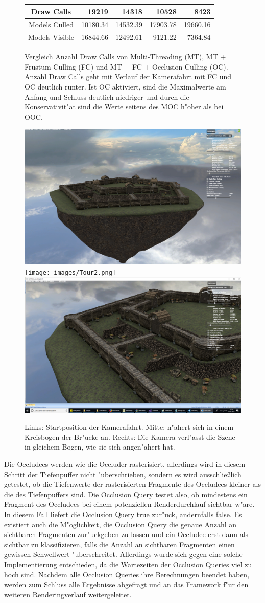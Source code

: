 \documentclass[journal]{vgtc}
\begin{document}
\begin{figure}
\begin{minipage}{\textwidth}
{\begin{tabular}{| c | r | r | r | r |}
				Draw Calls           & 19219     & 14318     & 10528    & 8423		\\ \hline
				Models Culled        & 10180.34  & 14532.39  & 17903.78 & 19660.16 	\\ \hline
				Models Visible       & 16844.66  & 12492.61  & 9121.22  & 7364.84 	\\ \hline
		\end{tabular}}
	\end{minipage}
	\caption{Vergleich Anzahl Draw Calls von Multi-Threading (MT), MT + Frustum Culling (FC) und MT + FC + Occlusion Culling (OC). Anzahl Draw Calls geht mit Verlauf der Kamerafahrt mit FC und OC deutlich runter. Ist OC aktiviert, sind die Maximalwerte am Anfang und Schluss deutlich niedriger und durch die Konservativit"at sind die Werte seitens des MOC h"oher als bei OOC.}
	\label{fig:OGL_MOC_frustum_culling}
\end{figure}

\begin{figure}%
	\includegraphics[width=0.33\columnwidth]{images/Tour1.png}%
	\texttt{[image: images/Tour2.png]}%
	\includegraphics[width=0.33\columnwidth]{images/Tour3.png}%
	\caption{Links: Startposition der Kamerafahrt. Mitte: n"ahert sich in einem Kreisbogen der Br"ucke an. Rechts: Die Kamera verl"asst die Szene in gleichem Bogen, wie sie sich angen"ahert hat.}%
	\label{fig:fahrt}%
\end{figure}

Die Occludees werden wie die Occluder rasterisiert, allerdings wird in diesem Schritt der Tiefenpuffer nicht "uberschrieben, sondern es wird ausschlie{\ss}lich getestet, ob
die Tiefenwerte der rasterisierten Fragmente des Occludees kleiner als die des Tiefenpuffers sind.
Die Occlusion Query testet also, ob mindestens ein Fragment des Occludees bei einem potenziellen Renderdurchlauf sichtbar w"are.
In diesem Fall liefert die Occlusion Query \glqq true\grqq{} zur"uck, andernfalls \glqq false\grqq{}.
Es existiert auch die M"oglichkeit, die Occlusion Query die genaue Anzahl an sichtbaren Fragmenten zur"uckgeben zu lassen und ein Occludee erst dann als sichtbar zu klassifizieren, falls die Anzahl an sichtbaren Fragmenten einen gewissen Schwellwert "uberschreitet.
Allerdings wurde sich gegen eine solche Implementierung entschieden, da die Wartezeiten der Occlusion Queries viel zu hoch sind.
Nachdem alle Occlusion Queries ihre Berechnungen beendet haben, werden zum Schluss alle Ergebnisse abgefragt und an das Framework f"ur den weiteren Renderingverlauf weitergeleitet.
\end{document}
